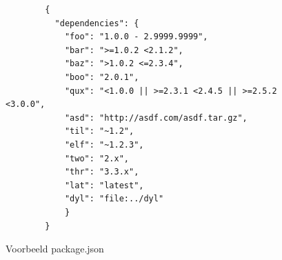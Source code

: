 \begin{figure}[H]
    \centering
    \begin{verbatim}
        {
          "dependencies": {
            "foo": "1.0.0 - 2.9999.9999",
            "bar": ">=1.0.2 <2.1.2",
            "baz": ">1.0.2 <=2.3.4",
            "boo": "2.0.1",
            "qux": "<1.0.0 || >=2.3.1 <2.4.5 || >=2.5.2 <3.0.0",
            "asd": "http://asdf.com/asdf.tar.gz",
            "til": "~1.2",
            "elf": "~1.2.3",
            "two": "2.x",
            "thr": "3.3.x",
            "lat": "latest",
            "dyl": "file:../dyl"
            }
        }
        \end{verbatim}
        \caption{Voorbeeld package.json \autocite{Kaplan2024}}
\end{figure}

